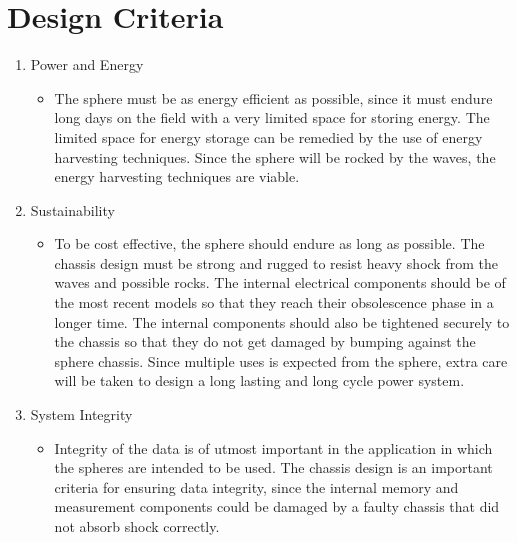 \section{Design Criteria}
\begin{enumerate}
\item Power and Energy
	\begin{itemize}
	\item The sphere must be as energy efficient as possible, since it must endure long days on the field with a very limited space for storing energy. The limited space for energy storage can be remedied by the use of energy harvesting techniques. Since the sphere will be rocked by the waves, the energy harvesting techniques are viable.
	\end{itemize}
\item Sustainability
	\begin{itemize}
	\item To be cost effective, the sphere should endure as long as possible. The chassis design must be strong and rugged to resist heavy shock from the waves and possible rocks. The internal electrical components should be of the most recent models so that they reach their obsolescence phase in a longer time. The internal components should also be tightened securely to the chassis so that they do not get damaged by bumping against the sphere chassis. Since multiple uses is expected from the sphere, extra care will be taken to design a long lasting and long cycle power system.
	\end{itemize}
\item System Integrity
	\begin{itemize}
	\item Integrity of the data is of utmost important in the application in which the spheres are intended to be used. The chassis design is an important criteria for ensuring data integrity, since the internal memory and measurement components could be damaged by a faulty chassis that did not absorb shock correctly. 
	\end{itemize}
\end{enumerate}
